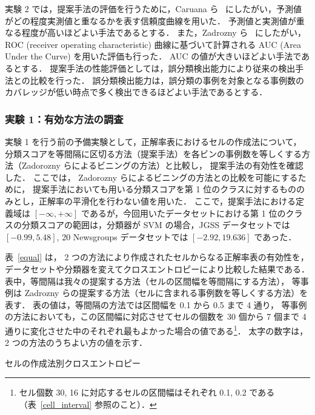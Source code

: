 \documentclass[japanese]{jnlp_1.4}
\begin{document}
実験 2 では，提案手法の評価を行うために，Caruana ら~\cite{Caruana04,Mizil05} にしたがい，予測値がどの程度実測値と重なるかを表す信頼度曲線を用いた．
予測値と実測値が重なる程度が高いほどよい手法であるとする．
また，Zadrozny ら~\cite{Zadrozny05} にしたがい，ROC (receiver operating characteristic) 曲線に基づいて計算される AUC (Area Under the Curve) を用いた評価も行った．
AUC の値が大きいほどよい手法であるとする．
提案手法の性能評価としては，誤分類検出能力により従来の検出手法との比較を行った．
誤分類検出能力は，誤分類の事例を対象となる事例数のカバレッジが低い時点で多く検出できるほどよい手法であるとする．

\subsubsection{実験 1：有効な方法の調査}


実験 1 を行う前の予備実験として，正解率表におけるセルの作成法について，
分類スコアを等間隔に区切る方法（提案手法）を各ビンの事例数を等しくする方法（Zadorozny らによるビニングの方法）と比較し，
提案手法の有効性を確認した．
ここでは，
Zadorozny らによるビニングの方法との比較を可能にするために，
提案手法においても用いる分類スコアを第 1 位のクラスに対するもののみとし，正解率の平滑化を行わない値を用いた．
ここで，提案手法における定義域は $[-\infty,+\infty]$ であるが，今回用いたデータセットにおける第 1 位のクラスの分類スコアの範囲は，分類器が SVM の場合，JGSS データセットでは $[-0.99,5.48]$, 20 Newsgroups データセットでは $[-2.92,19.636]$ であった．

表~\ref{equal} は，
2 つの方法により作成されたセルからなる正解率表の有効性を，
データセットや分類器を変えてクロスエントロピーにより比較した結果である．
表中，等間隔は我々の提案する方法（セルの区間幅を等間隔にする方法），
等事例は Zadrozny らの提案する方法（セルに含まれる事例数を等しくする方法）を表す．
表の値は，等間隔の方法では区間幅を 0.1 から 0.5 まで 4 通り，
等事例の方法においても，この区間幅に対応させてセルの個数を 30 個から 7 個まで 4 通りに変化させた中のそれぞれ最もよかった場合の値である\footnote{
	セル個数 30, 16 に対応するセルの区間幅はそれぞれ 0.1, 0.2 である
	（表~\ref{cell_interval} 参照のこと）．
}．
太字の数字は，2 つの方法のうちよい方の値を示す．

\begin{table}[b]
\begin{center}
\caption{セルの作成法別クロスエントロピー}
\label{equal}

\end{center}
\end{table}
\end{document}
